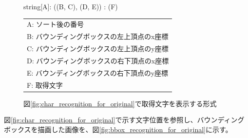 \begin{figure}[tp]
    \begin{center}
        string[A]: ((B, C), (D, E)) : (F)
    \end{center}

    \begin{center}
        \begin{tabular}{l}
        A: ソート後の番号\\  
        B: バウンディングボックスの左上頂点のx座標\\
        C: バウンディングボックスの左上頂点のy座標\\  
        D: バウンディングボックスの右下頂点のx座標\\
        E: バウンディングボックスの右下頂点のy座標\\
        F: 取得文字\\
        \end{tabular}
    \end{center}
    \caption{図\ref{fig:char_recognition_for_original}で取得文字を表示する形式}
    \label{fig:format_char}
\end{figure}
図\ref{fig:char_recognition_for_original}で示す文字位置を参照し、バウンディングボックスを描画した画像を、図\ref{fig:bbox_recognition_for_original}に示す。
